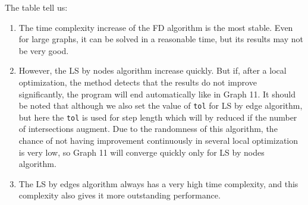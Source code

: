 The table tell us:
\begin{enumerate}
    \item The time complexity increase of the FD algorithm is the most stable. Even for large graphs, it can be solved in a reasonable time, but its results may not be very good.
    \item However, the LS by nodes algorithm increase quickly. But if, after a local optimization, the method detects that the results do not improve significantly, the program will end automatically like in Graph 11. It should be noted that although we also set the value of \lstinline{tol} for LS by edge algorithm, but here the \lstinline{tol} is used for step length which will by reduced if the number of intersections augment. Due to the randomness of this algorithm, the chance of not having improvement continuously in several local optimization is very low, so Graph 11 will converge quickly only for LS by nodes algorithm.
    \item The LS by edges algorithm always has a very high time complexity, and this complexity also gives it more outstanding performance.
\end{enumerate}

